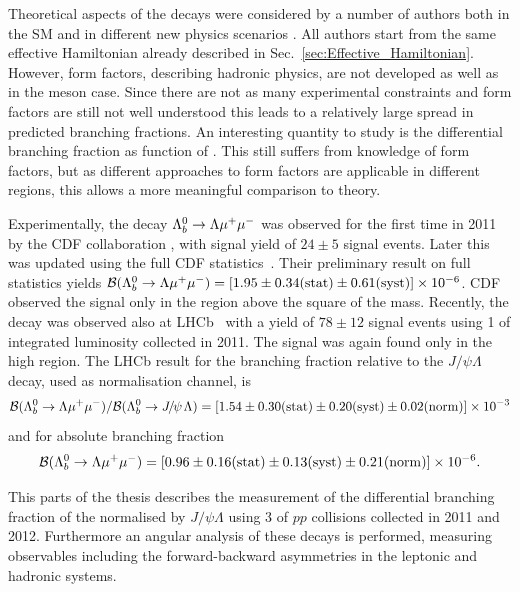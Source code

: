 Theoretical aspects of the \Lb\to\Lz\mumu decays were considered by a number of authors both in the SM and in different new physics scenarios
\cite{Aslam:2008hp,Wang:2008sm,Huang:1998ek,Chen:2001ki,Chen:2001zc,Chen:2001sj,Zolfagharpour:2007eh,Mott:2011cx,Aliev:2010uy,Mohanta:2010eb,Sahoo:2011yb}.
All authors start from the same effective Hamiltonian already described in Sec.~\ref{sec:Effective_Hamiltonian}. However, form factors, describing hadronic physics, are not developed as well as in the meson case.
Since there are not as many experimental constraints and form factors are still not well understood this leads to a relatively
large spread in predicted branching fractions. An interesting quantity to study is the differential branching fraction as
function of \qsq. This still suffers from knowledge of form factors, but as different
approaches to form factors are applicable in different \qsq regions, this allows a more meaningful comparison to theory.

Experimentally, the decay $\Lambda^0_b\rightarrow\Lambda\mu^+\mu^-$ was observed for the first time in 2011 by the CDF collaboration
\cite{Aaltonen:2011qs}, with signal yield of $24\pm5$ signal events. Later this was updated using the full
CDF statistics~\cite{CDF:10894}. Their preliminary result on full statistics yields
$\mathcal{B}(\Lambda^0_b\rightarrow\Lambda\mu^+\mu^-) =[1.95\pm0.34(\mathrm{stat})\pm0.61(\mathrm{syst})]\times 10^{-6}$. CDF observed the signal
only in the \qsq region above the square of the \psitwos mass.
Recently, the decay was observed also at LHCb~\cite{LHCb-PAPER-2013-025} with a yield of $78\pm12$ signal events
using 1 \invfb of integrated luminosity collected in 2011. The signal was again found only in the high \qsq region.
The LHCb result for the branching fraction relative to the $J/\psi\Lambda$ decay, used as normalisation channel, is 
%
\begin{equation*}
\mathcal{B}(\Lb\to\Lz\mumu)/\mathcal{B}(\Lb\to\jpsi\Lz)=[1.54\pm0.30(\mathrm{stat})\pm0.20(\mathrm{syst})\pm0.02(\mathrm{norm})]\times 10^{-3} 
\end{equation*}
and for absolute branching fraction
\begin{equation*}
\mathcal{B}(\Lambda^0_b\rightarrow\Lambda\mu^+\mu^-) =[0.96\pm0.16(\mathrm{stat})\pm0.13(\mathrm{syst})\pm0.21(\mathrm{norm})]\times 10^{-6}.
\end{equation*}

This parts of the thesis describes the measurement of the differential branching fraction
of the \Lb\to\Lz\mumu normalised by $J/\psi\Lambda$ using 3 \invfb of $pp$ collisions collected in 2011 and 2012.
Furthermore an angular analysis of these decays is performed, measuring observables including
the forward-backward asymmetries in the leptonic and hadronic systems.

